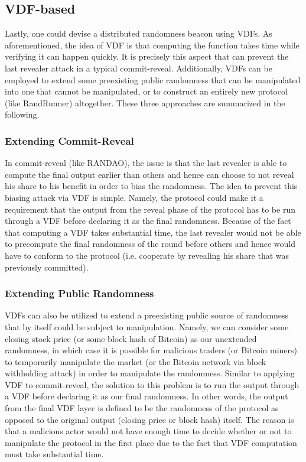 \documentclass[letterpaper,twocolumn,10pt]{article}
\theoremstyle{definition}
\theoremstyle{remark}
\begin{document}

\subsection{VDF-based}
Lastly, one could devise a distributed randomness beacon using VDFs. As aforementioned, the idea of VDF is that computing the function takes time while verifying it can happen quickly. It is precisely this aspect that can prevent the last revealer attack in a typical commit-reveal. Additionally, VDFs can be employed to extend some preexisting public randomness that can be manipulated into one that cannot be manipulated, or to construct an entirely new protocol (like RandRunner) altogether. These three approaches are summarized in the following.

\subsubsection{Extending Commit-Reveal}
In commit-reveal (like RANDAO), the issue is that the last revealer is able to compute the final output earlier than others and hence can choose to not reveal his share to his benefit in order to bias the randomness. The idea to prevent this biasing attack via VDF is simple. Namely, the protocol could make it a requirement that the output from the reveal phase of the protocol has to be run through a VDF before declaring it as the final randomness. Because of the fact that computing a VDF takes substantial time, the last revealer would not be able to precompute the final randomness of the round before others and hence would have to conform to the protocol (i.e. cooperate by revealing his share that was previously committed).

\subsubsection{Extending Public Randomness}
VDFs can also be utilized to extend a preexisting public source of randomness that by itself could be subject to manipulation. Namely, we can consider some closing stock price (or some block hash of Bitcoin) as our unextended randomness, in which case it is possible for malicious traders (or Bitcoin miners) to temporarily manipulate the market (or the Bitcoin network via block withholding attack) in order to manipulate the randomness. Similar to applying VDF to commit-reveal, the solution to this problem is to run the output through a VDF before declaring it as our final randomness. In other words, the output from the final VDF layer is defined to be the randomness of the protocol as opposed to the original output (closing price or block hash) itself. The reason is that a malicious actor would not have enough time to decide whether or not to manipulate the protocol in the first place due to the fact that VDF computation must take substantial time.
\end{document}
